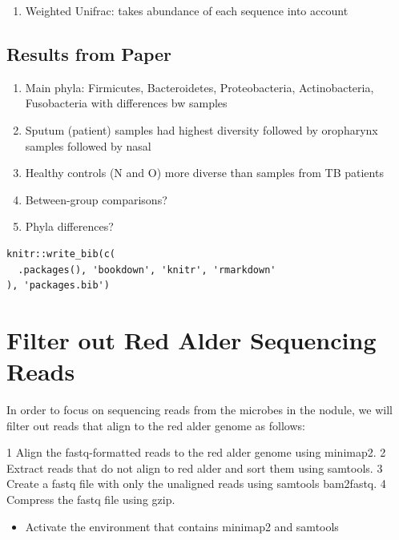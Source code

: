 \documentclass[
]{book}
\providecommand{\tightlist}{%
  \setlength{\itemsep}{0pt}\setlength{\parskip}{0pt}}
\begin{document}
\begin{enumerate}
\def\labelenumi{\arabic{enumi}.}
\setcounter{enumi}{1}
\tightlist
\item
  Weighted Unifrac: takes abundance of each sequence into account
\end{enumerate}

\hypertarget{results-from-paper}{%
\section{Results from Paper}\label{results-from-paper}}

\begin{enumerate}
\def\labelenumi{\arabic{enumi}.}
\tightlist
\item
  Main phyla: Firmicutes, Bacteroidetes, Proteobacteria, Actinobacteria, Fusobacteria with differences bw samples
\item
  Sputum (patient) samples had highest diversity followed by oropharynx samples followed by nasal
\item
  Healthy controls (N and O) more diverse than samples from TB patients
\item
  Between-group comparisons?
\item
  Phyla differences?
\end{enumerate}

\begin{verbatim}
knitr::write_bib(c(
  .packages(), 'bookdown', 'knitr', 'rmarkdown'
), 'packages.bib')
\end{verbatim}

\hypertarget{filter-out-red-alder-sequencing-reads}{%
\chapter{Filter out Red Alder Sequencing Reads}\label{filter-out-red-alder-sequencing-reads}}

In order to focus on sequencing reads from the microbes in the nodule, we will filter out reads that align to the red alder genome as follows:

1 Align the fastq-formatted reads to the red alder genome using minimap2.
2 Extract reads that do not align to red alder and sort them using samtools.
3 Create a fastq file with only the unaligned reads using samtools bam2fastq.
4 Compress the fastq file using gzip.

\begin{itemize}
\tightlist
\item
  Activate the environment that contains minimap2 and samtools
\end{itemize}
\end{document}
